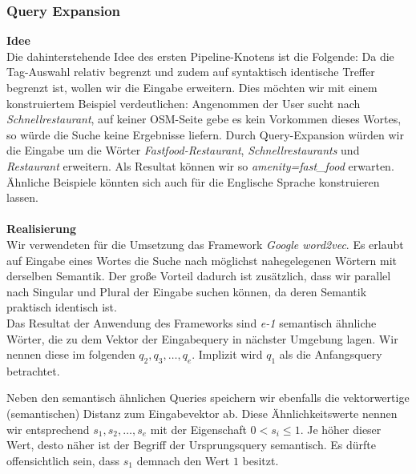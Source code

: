 \documentclass[12pt,pdftex,a4paper]{article}
\begin{document}
\subsubsection{Query Expansion}\label{sec:expansion}
\textbf{Idee}\\
Die dahinterstehende Idee des ersten Pipeline-Knotens ist die Folgende: Da die Tag-Auswahl relativ begrenzt und zudem auf syntaktisch identische Treffer begrenzt ist, wollen wir die Eingabe erweitern. Dies möchten wir mit einem konstruiertem Beispiel verdeutlichen: Angenommen der User sucht nach \textit{Schnellrestaurant}, auf keiner OSM-Seite gebe es kein Vorkommen dieses Wortes, so würde die Suche keine Ergebnisse liefern. Durch Query-Expansion würden wir die Eingabe um die Wörter \textit{Fastfood-Restaurant}, \textit{Schnellrestaurants} und \textit{Restaurant} erweitern. Als Resultat können wir so \textit{amenity=fast\_food} erwarten. Ähnliche Beispiele könnten sich auch für die Englische Sprache konstruieren lassen.\\
\textit{}\\
\textbf{Realisierung}\\
Wir verwendeten für die Umsetzung das Framework \textit{Google word2vec}\cite{googleword2vec}. Es erlaubt auf Eingabe eines Wortes die Suche nach möglichst nahegelegenen Wörtern mit derselben Semantik. Der große Vorteil dadurch ist zusätzlich, dass wir parallel nach Singular und Plural der Eingabe suchen können, da deren Semantik praktisch identisch ist.\\
Das Resultat der Anwendung des Frameworks sind \textit{e-1} semantisch ähnliche Wörter, die zu dem Vektor der Eingabequery in nächster Umgebung lagen. Wir nennen diese im folgenden $q_2, q_3, \dots, q_e$. Implizit wird $q_1$ als die Anfangsquery betrachtet.

Neben den semantisch ähnlichen Queries speichern wir ebenfalls die vektorwertige (semantischen) Distanz zum Eingabevektor ab. Diese Ähnlichkeitswerte nennen wir entsprechend  $s_1, s_2, \dots, s_e$ mit der Eigenschaft $0 < s_i \leq 1$. Je höher dieser Wert, desto näher ist der Begriff der Ursprungsquery semantisch. Es dürfte offensichtlich sein, dass $s_1$ demnach den Wert $1$ besitzt.
\end{document}
